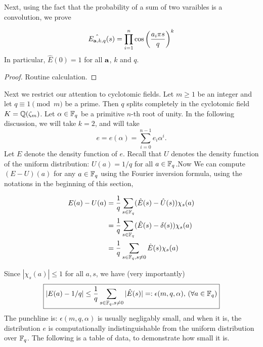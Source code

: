\documentclass{amsart}
\begin{document}
Next, using the fact that the probability of a sum of two varaibles is a convolution, we prove
\begin{Lemma}
\[
    \hat{E_{{\bf a}, k, q}}(s) = \prod_{i=1}^{n} \cos \left(\frac{ a_i \pi s}{q} \right)^k
\]
In particular, $\hat{E}(0) = 1$ for all ${\bf a}$, $k$ and $q$.
\end{Lemma}

\begin{proof}
Routine calculation.
\end{proof}






Next we restrict our attention to cyclotomic fields. Let
$m \geq 1$ be an integer and let $q \equiv 1 \pmod{m}$ be a prime. Then $q$ splits completely in the cyclotomic field $K = \mathbb{Q}(\zeta_m)$. Let $\alpha \in \mathbb{F}_q$ be a primitive $n$-th root of unity. In the following discussion, we will take $k =2$, and will take
\[
    e = e(\alpha) = \sum_{i=0}^{n-1} e_i \alpha^i.
\]
Let $E$ denote the density function of $e$. Recall that $U$ denotes the density function of the uniform distribution: $U(a) = 1/q$ for all $a \in \mathbb{F}_q$.Now We can compute $(E - U)(a)$ for any $a \in \mathbb{F}_q$ using the Fourier inversion formula, using the notations in the beginning of this section,

\begin{align*}
    E(a) - U(a) &= \frac{1}{q} \sum_{s \in \mathbb{F}_q} (\hat{E}(s) - \hat{U}(s) )\chi_s(a) \\
& = \frac{1}{q} \sum_{s \in \mathbb{F}_q} (\hat{E}(s) - \delta(s) )\chi_s(a) \\
& = \frac{1}{q} \sum_{s \in \mathbb{F}_q, s \neq 0} \hat{E}(s) \chi_s(a)
\end{align*}

Since $|\chi_s(a)| \leq 1$ for all $a, s$, we have (very importantly)
\[
    \boxed{|E(a) -  1/q| \leq \frac{1}{q}  \sum_{s \in \mathbb{F}_q, s \neq 0}  |\hat{E}(s)| =: \epsilon(m,q,\alpha), \, (\forall a \in \mathbb{F}_q)}
\]
The punchline is: $\epsilon(m,q,\alpha)$ is usually negligably small, and when it is, the distribution $e$ is computationally indistinguishable from the uniform distribution over $\mathbb{F}_q$. The following is a table of data, to demonstrate how small it is.
\end{document}
